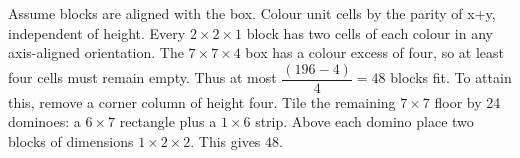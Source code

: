 Assume blocks are aligned with the box. Colour unit cells by the parity of x+y, independent of height. Every $2\times2\times1$ block has two cells of each colour in any axis-aligned orientation. The $7\times7\times4$ box has a colour excess of four, so at least four cells must remain empty. Thus at most $\dfrac{(196-4)}{4}=48$ blocks fit. To attain this, remove a corner column of height four. Tile the remaining $7\times7$ floor by 24 dominoes: a $6\times7$ rectangle plus a $1\times6$ strip. Above each domino place two blocks of dimensions $1\times2\times2$. This gives $\boxed{48}$.

